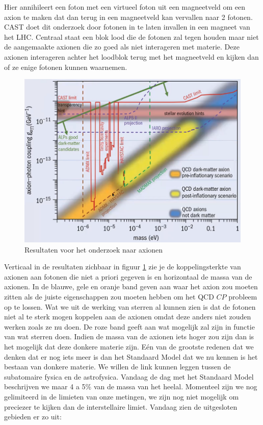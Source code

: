 \documentclass[../main.tex]{subfiles}
\begin{document}
Hier annihileert een foton met een virtueel foton uit een magneetveld om een axion te maken dat dan terug in een magneetveld kan vervallen naar 2 fotonen. CAST doet dit onderzoek door fotonen in te laten invallen in een magneet van het LHC. Centraal staat een blok lood die de fotonen zal tegen houden maar niet de aangemaakte axionen die zo goed als niet interageren met materie. Deze axionen interageren achter het loodblok terug met het magneetveld en kijken dan of ze enige fotonen kunnen waarnemen.

\begin{figure}[h]
    \centering
    \includegraphics[width=0.6\linewidth]{physics_beyond_the_standard_model/cast_resultaten.png}
    \caption{Resultaten voor het onderzoek naar axionen}%
    \label{fig:physics_beyond_the_standard_model/cast_resultaten}
\end{figure}

Verticaal in de resultaten zichbaar in figuur \ref{fig:physics_beyond_the_standard_model/cast_resultaten} zie je de koppelingsterkte van axionen aan fotonen die niet a priori gegeven is en horizontaal de massa van de axionen. In de blauwe, gele en oranje band geven aan waar het axion zou moeten zitten als de juiste eigenschappen zou moeten hebben om het QCD $CP$ probleem op te lossen. Wat we uit de werking van sterren al kunnen zien is dat de fotonen niet al te sterk mogen koppelen aan de axionen omdat deze anders niet zouden werken zoals ze nu doen. De roze band geeft aan wat mogelijk zal zijn in functie van wat sterren doen. Indien de massa van de axionen iets hoger zou zijn dan is het mogelijk dat deze donkere materie zijn. Eén van de grootste redenen dat we denken dat er nog iets meer is dan het Standaard Model dat we nu kennen is het bestaan van donkere materie. We willen de link kunnen leggen tussen de subatomaire fysica en de astrofysica. Vandaag de dag met het Standaard Model beschrijven we maar 4 a 5\% van de massa van het heelal. Momenteel zijn we nog gelimiteerd in de limieten van onze metingen, we zijn nog niet mogelijk om preciezer te kijken dan de interstellaire limiet. Vandaag zien de uitgesloten gebieden er zo uit:
\end{document}
